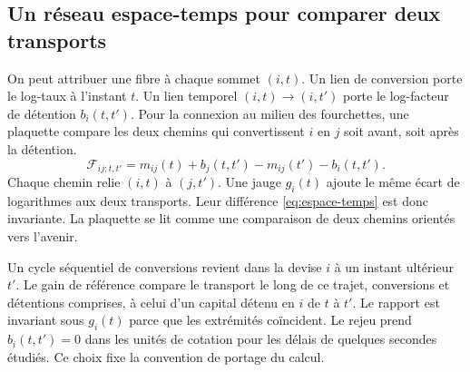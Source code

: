 \documentclass[11pt,a4paper]{article}
\theoremstyle{clair}
\newcommand{\arrowfx}{\mathbin{\to}}
\begin{document}
\subsection{Un réseau espace-temps pour comparer deux transports}
\label{sec:temps}

On peut attribuer une fibre à chaque sommet \((i,t)\). Un lien de conversion porte le log-taux à l'instant \(t\). Un lien temporel \((i,t)\arrowfx(i,t')\) porte le log-facteur de détention \(b_i(t,t')\). Pour la connexion au milieu des fourchettes, une plaquette compare les deux chemins qui convertissent \(i\) en \(j\) soit avant, soit après la détention.
\begin{equation}
 \mathcal F_{ij;t,t'}
   =m_{ij}(t)+b_j(t,t')-m_{ij}(t')-b_i(t,t').
 \label{eq:espace-temps}
\end{equation}
Chaque chemin relie \((i,t)\) à \((j,t')\). Une jauge \(g_i(t)\) ajoute le même écart de logarithmes aux deux transports. Leur différence \eqref{eq:espace-temps} est donc invariante. La plaquette se lit comme une comparaison de deux chemins orientés vers l'avenir.

\begin{center}
\end{center}

Un cycle séquentiel de conversions revient dans la devise \(i\) à un instant ultérieur \(t'\). Le gain de référence compare le transport le long de ce trajet, conversions et détentions comprises, à celui d'un capital détenu en \(i\) de \(t\) à \(t'\). Le rapport est invariant sous \(g_i(t)\) parce que les extrémités coïncident. Le rejeu prend \(b_i(t,t')=0\) dans les unités de cotation pour les délais de quelques secondes étudiés. Ce choix fixe la convention de portage du calcul.

\clearpage
\end{document}
